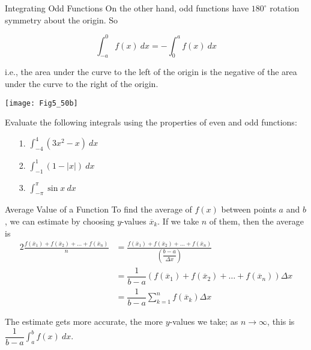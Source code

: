 \documentclass[14pt]{beamer}
\newcommand{\dint}{\displaystyle\int}
\begin{document}
\begin{frame}{\small Integrating Odd Functions}
\footnotesize
On the other hand, odd functions have $180^{\circ}$ rotation symmetry about the origin.  So

\vspace{-1.25pc}
\[ \int_{-a}^0 f(x)\ dx = -\int_0^a f(x)\ dx\]

\vspace{-0.3pc}
i.e., the area under the curve to the left of the origin is the negative of the area under the curve to the right of the origin.

\vspace{-0.6pc}
\begin{center}
\texttt{[image: Fig5\_50b]}
\end{center}
\end{frame}

\begin{frame}%
\begin{exe}Evaluate the following integrals using the properties of even and odd functions:

\begin{itemize}

\vspace{0.25pc}
\item[1.] $\dint_{-4}^4 (3x^2-x)\ dx$

\vspace{0.5pc}
\item[2.] $\dint_{-1}^1 (1-|x|)\ dx$

\vspace{0.5pc}
\item [3.] $\dint_{-\pi}^{\pi} \sin x \ dx$
\end{itemize}
\end{exe}
\end{frame}

\begin{frame}{\small Average Value of a Function}
\footnotesize
To find the average of $f(x)$ between points $a$ and $b$, we can estimate by choosing $y$-values $\overline{x}_k$.  If we take $n$ of them, then the average is 
\begin{alignat*}{2}
\frac{f(\overline{x}_1) + f(\overline{x}_2) + \dots + f(\overline{x}_n)}{n} &= 
\frac{f(\overline{x}_1) + f(\overline{x}_2) + \dots + f(\overline{x}_n)}{\left(\dfrac{b-a}{\Delta x}\right)} \\
&= \dfrac{1}{b-a} \left(f(\overline{x}_1) + f(\overline{x}_2) + \dots + f(\overline{x}_n) \right) \Delta x \\
 &= \dfrac{1}{b-a}\sum_{k=1}^nf(\overline{x}_k)\Delta x
\end{alignat*}

The estimate gets more accurate, the more $y$-values we take; as $n \to \infty$, this is \alert{$\dfrac{1}{b-a}\dint_a^b f(x)\ dx$}.
\end{frame}
\end{document}
